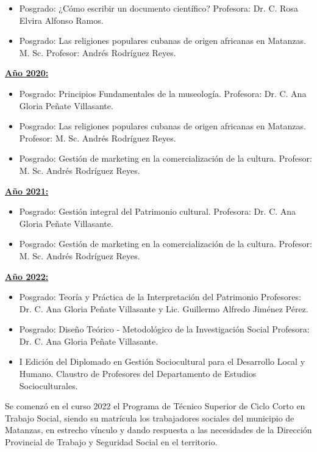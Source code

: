 \begin{itemize}
	\setlength\itemsep{-0.5em}
	\item Posgrado: ¿Cómo escribir un documento científico? Profesora: Dr. C. Rosa Elvira Alfonso Ramos.
	\item Posgrado: Las religiones populares cubanas de origen africanas en Matanzas. M. Sc. Profesor: Andrés Rodríguez Reyes. 
\end{itemize}

\underline{\textbf{Año 2020:}}

\begin{itemize}
	\setlength\itemsep{-0.5em}
	\item Posgrado: Principios Fundamentales de la museología. Profesora: Dr. C. Ana Gloria Peñate Villasante.
	\item Posgrado: Las religiones populares cubanas de origen africanas en Matanzas. Profesor: M. Sc. Andrés Rodríguez Reyes.
	\item Posgrado: Gestión de marketing en la comercialización de la cultura. Profesor: M. Sc. Andrés Rodríguez Reyes. 
\end{itemize}

\underline{\textbf{Año 2021:}}

\begin{itemize}
	\setlength\itemsep{-0.5em}
	\item Posgrado: Gestión integral del Patrimonio cultural. Profesora: Dr. C. Ana Gloria Peñate Villasante.
	\item Posgrado: Gestión de marketing en la comercialización de la cultura. Profesor: M. Sc. Andrés Rodríguez Reyes.
\end{itemize}

\underline{\textbf{Año 2022:}}

\begin{itemize}
	\setlength\itemsep{-0.5em}
	\item Posgrado: Teoría y Práctica de la Interpretación del Patrimonio Profesores: Dr. C. Ana Gloria Peñate Villasante y Lic. Guillermo Alfredo Jiménez Pérez.
	\item Posgrado: Diseño Teórico - Metodológico de la Investigación Social Profesora: Dr. C. Ana Gloria Peñate Villasante.
	\item I Edición del Diplomado en Gestión Sociocultural para el Desarrollo Local y Humano. Claustro de Profesores del Departamento de Estudios Socioculturales.
\end{itemize}

Se comenzó en el curso 2022 el Programa de Técnico Superior de Ciclo Corto en Trabajo Social, siendo su matrícula los trabajadores sociales del municipio de Matanzas, en estrecho vínculo y dando respuesta a las necesidades de la Dirección Provincial de Trabajo y Seguridad Social en el territorio. 
 

